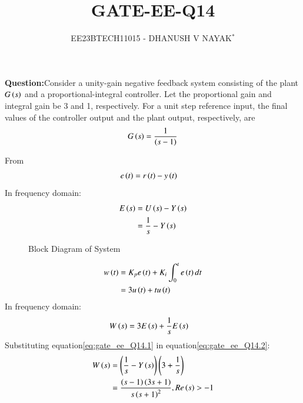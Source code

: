 \documentclass[journal,12pt,twocolumn]{IEEEtran}
\theoremstyle{remark}
\begin{document}

\title{GATE-EE-Q14}
\author{EE23BTECH11015 - DHANUSH V NAYAK$^{*}$%
}
\maketitle
\newpage
\bigskip
\renewcommand{\thefigure}{\arabic{figure}}
\renewcommand{\thetable}{\theenumi}
\textbf{Question:}Consider a unity-gain negative feedback system consisting of the plant $G\left(s\right)$  and a proportional-integral controller. Let the proportional gain and integral
gain be 3 and 1, respectively. For a unit step reference input, the final values of the
controller output and the plant output, respectively, are
\begin{align}
    G\left(s\right) = \frac{1}{\left(s-1\right)} \notag
\end{align}
\solution 

From 
\begin{align}
    e\left(t\right) &= r\left(t\right) - y\left(t\right)  
\end{align}
In frequency domain:
\begin{align}
    E\left(s\right)&= U\left(s\right) - Y\left(s\right)\\
             &= \frac{1}{s} - Y\left(s\right)\label{eq:gate_ee_Q14.1}
\end{align}
\begin{figure}[H]
    \resizebox{0.55\textwidth}{!}{}
    \caption{Block Diagram of System}
    \label{fig:gate_ee_Q14_blockdiagram}
\end{figure}

\begin{align}
    w\left(t\right) &= K_{p}e\left(t\right) + K_{i}\int_{0}^{t}e\left(t\right) dt \\
                &= 3u\left(t\right) + tu\left(t\right) 
\end{align}
In frequency domain:
\begin{align}
    W\left(s\right) &= 3E\left(s\right) + \frac{1}{s}E\left(s\right)\label{eq:gate_ee_Q14.2}
\end{align}
Substituting equation\eqref{eq:gate_ee_Q14.1} in  equation\eqref{eq:gate_ee_Q14.2}:
\begin{align}
    W\left(s\right) &= \left(\frac{1}{s} - Y\left(s\right)\right)\left(3 + \frac{1}{s}\right)\\
            &= \frac{\left(s-1\right)\left(3s+1\right)}{s\left(s+1\right)^2} ,  Re\left(s\right)>-1
\end{align}
\end{document}
